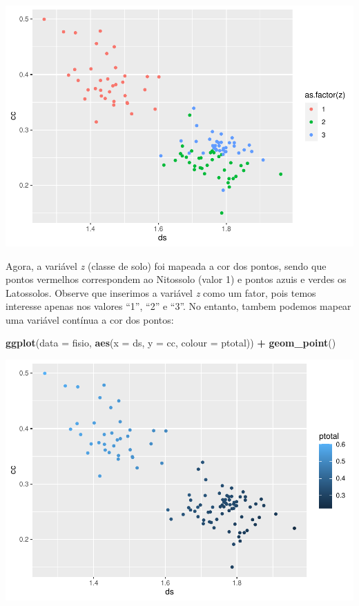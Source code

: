 \documentclass[]{book}
\newenvironment{Shaded}{\begin{snugshade}}{\end{snugshade}}
\newcommand{\DataTypeTok}[1]{\textcolor[rgb]{0.13,0.29,0.53}{#1}}
\newcommand{\KeywordTok}[1]{\textcolor[rgb]{0.13,0.29,0.53}{\textbf{#1}}}
\newcommand{\NormalTok}[1]{#1}
\newcommand{\OperatorTok}[1]{\textcolor[rgb]{0.81,0.36,0.00}{\textbf{#1}}}
\newcommand{\StringTok}[1]{\textcolor[rgb]{0.31,0.60,0.02}{#1}}
\begin{document}
\includegraphics{TudodoR_files/figure-latex/unnamed-chunk-187-1.pdf}

Agora, a variável \emph{z} (classe de solo) foi mapeada a cor dos pontos, sendo que pontos vermelhos correspondem ao Nitossolo (valor 1) e pontos azuis e verdes os Latossolos. Observe que inserimos a variável \emph{z} como um fator, pois temos interesse apenas nos valores ``1'', ``2'' e ``3''. No entanto, tambem podemos mapear uma variável contínua a cor dos pontos:

\begin{Shaded}
\begin{Highlighting}[]
\KeywordTok{ggplot}\NormalTok{(}\DataTypeTok{data =}\NormalTok{ fisio, }\KeywordTok{aes}\NormalTok{(}\DataTypeTok{x =}\NormalTok{ ds, }\DataTypeTok{y =}\NormalTok{ cc, }\DataTypeTok{colour =}\NormalTok{ ptotal)) }\OperatorTok{+}
\StringTok{  }\KeywordTok{geom_point}\NormalTok{()}
\end{Highlighting}
\end{Shaded}

\includegraphics{TudodoR_files/figure-latex/unnamed-chunk-188-1.pdf}
\end{document}
